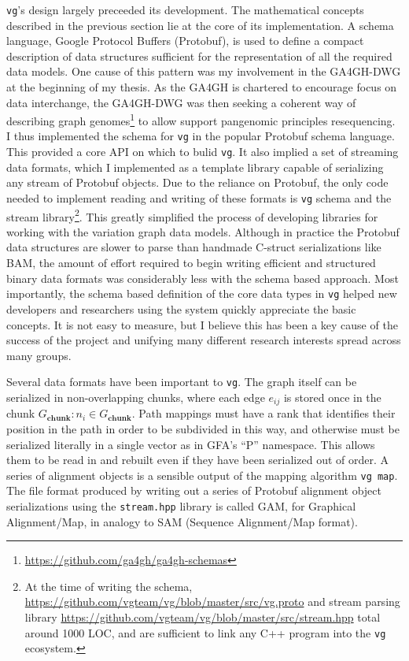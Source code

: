 {\tt vg}'s design largely preceeded its development.
The mathematical concepts described in the previous section lie at the core of its implementation.
A schema language, Google Protocol Buffers (Protobuf), is used to define a compact description of data structures sufficient for the representation of all the required data models.
One cause of this pattern was my involvement in the GA4GH-DWG at the beginning of my thesis.
As the GA4GH is chartered to encourage focus on data interchange, the GA4GH-DWG was then seeking a coherent way of describing graph genomes\footnote{\url{https://github.com/ga4gh/ga4gh-schemas}} to allow support pangenomic principles resequencing.
I thus implemented the schema for {\tt vg} in the popular Protobuf schema language.
This provided a core API on which to bulid {\tt vg}.
It also implied a set of streaming data formats, which I implemented as a template library capable of serializing any stream of Protobuf objects.
Due to the reliance on Protobuf, the only code needed to implement reading and writing of these formats is {\tt vg} schema and the stream library\footnote{At the time of writing the schema, \url{https://github.com/vgteam/vg/blob/master/src/vg.proto} and stream parsing library \url{https://github.com/vgteam/vg/blob/master/src/stream.hpp} total around 1000 LOC, and are sufficient to link any C++ program into the {\tt vg} ecosystem.}.
This greatly simplified the process of developing libraries for working with the variation graph data models.
Although in practice the Protobuf data structures are slower to parse than handmade C-struct serializations like BAM, the amount of effort required to begin writing efficient and structured binary data formats was considerably less with the schema based approach.
Most importantly, the schema based definition of the core data types in {\tt vg} helped new developers and researchers using the system quickly appreciate the basic concepts.
It is not easy to measure, but I believe this has been a key cause of the success of the project and unifying many different research interests spread across many groups.

Several data formats have been important to {\tt vg}.
The graph itself can be serialized in non-overlapping chunks, where each edge $e_{ij}$ is stored once in the chunk $G_\textbf{chunk} : n_i \in G_\textbf{chunk}$.
Path mappings must have a rank that identifies their position in the path in order to be subdivided in this way, and otherwise must be serialized literally in a single vector as in GFA's ``P'' namespace.
This allows them to be read in and rebuilt even if they have been serialized out of order.
A series of alignment objects is a sensible output of the mapping algorithm {\tt vg map}.
The file format produced by writing out a series of Protobuf alignment object serializations using the {\tt stream.hpp} library is called GAM, for Graphical Alignment/Map, in analogy to SAM (Sequence Alignment/Map format).

